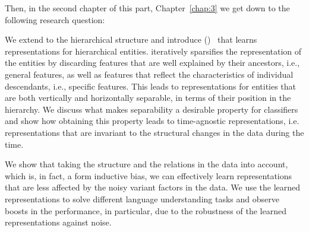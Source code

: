 Then, in the second chapter of this part, Chapter~\ref{chap:3} we get down to the following research question:

We extend \emph{\swlms} to the hierarchical structure and introduce \emph{\hswlms} (\achswlm)~\citep{Dehghani:2016:ICTIR, Dehghani:2016:CLEF} that learns representations for hierarchical entities. \achswlm iteratively sparsifies the representation of the entities by discarding features that are well explained by their ancestors, i.e., general features, as well as features that reflect the characteristics of individual descendants, i.e., specific features. This leads to representations for entities that are both vertically and horizontally separable, in terms of their position in the hierarchy. We discuss what makes separability a desirable property for classifiers and show how obtaining this property leads to time-agnostic representations, i.e. representations that are invariant to the structural changes in the data during the time.

\medskip
We show that taking the structure and the relations in the data into account, which is, in fact, a form inductive bias, we can effectively learn representations that are less affected by the noisy variant factors in the data. We use the learned representations to solve different language understanding tasks and observe boosts in the performance, in particular, due to the robustness of the learned representations against noise.


